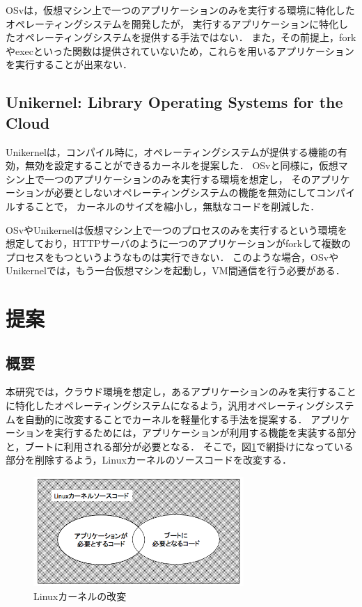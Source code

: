 \documentclass[graduation-thesis]{mlarticle}
\begin{document}
OSvは，仮想マシン上で一つのアプリケーションのみを実行する環境に特化したオペレーティングシステムを開発したが，
実行するアプリケーションに特化したオペレーティングシステムを提供する手法ではない．
また，その前提上，forkやexecといった関数は提供されていないため，これらを用いるアプリケーションを実行することが出来ない．


\subsection {Unikernel: Library Operating Systems for the Cloud}
\label{relative:unikernel}
Unikernelは，コンパイル時に，オペレーティングシステムが提供する機能の有効，無効を設定することができるカーネルを提案した．
OSvと同様に，仮想マシン上で一つのアプリケーションのみを実行する環境を想定し，
そのアプリケーションが必要としないオペレーティングシステムの機能を無効にしてコンパイルすることで，
カーネルのサイズを縮小し，無駄なコードを削減した．


OSvやUnikernelは仮想マシン上で一つのプロセスのみを実行するという環境を想定しており，HTTPサーバのように一つのアプリケーションがforkして複数のプロセスをもつというようなものは実行できない．
このような場合，OSvやUnikernelでは，もう一台仮想マシンを起動し，VM間通信を行う必要がある．


\clearpage
\section{提案}
\label{proposal}

\subsection{概要}
\label{proposal:abstruction}
本研究では，クラウド環境を想定し，あるアプリケーションのみを実行することに特化したオペレーティングシステムになるよう，汎用オペレーティングシステムを自動的に改変することでカーネルを軽量化する手法を提案する．
アプリケーションを実行するためには，アプリケーションが利用する機能を実装する部分と，ブートに利用される部分が必要となる．
そこで，図\ref{fig:kernelcode}で網掛けになっている部分を削除するよう，Linuxカーネルのソースコードを改変する．

\begin{figure}[H]
  \begin{center}
    \includegraphics[width=8.0cm]{images/kernelcode.png}
    \caption{Linuxカーネルの改変}
    \label{fig:kernelcode}
  \end{center}
\end{figure}
\end{document}
